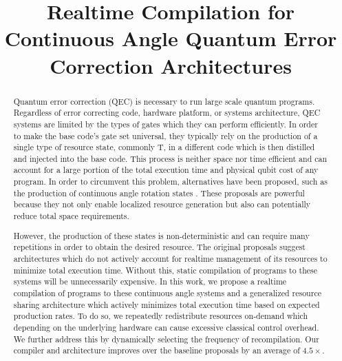 \documentclass[nonacm,sigplan]{acmart}
\begin{document}
\title{Realtime Compilation for Continuous Angle Quantum Error Correction Architectures}


\begin{abstract}
Quantum error correction (QEC) is necessary to run large scale quantum programs. Regardless of error correcting code, hardware platform, or systems architecture, QEC systems are limited by the types of gates which they can perform efficiently. In order to make the base code's gate set universal, they typically rely on the production of a single type of resource state, commonly T, in a different code which is then distilled and injected into the base code. This process is neither space nor time efficient and can account for a large portion of the total execution time and physical qubit cost of any program. In order to circumvent this problem, alternatives have been proposed, such as the production of continuous angle rotation states \cite{akahoshi2023partially, ding2018magic}. These proposals are powerful because they not only enable localized resource generation but also can potentially reduce total space requirements. 

However, the production of these states is non-deterministic and can require many repetitions in order to obtain the desired resource. The original proposals suggest architectures which do not actively account for realtime management of its resources to minimize total execution time. Without this, static compilation of programs to these systems will be unnecessarily expensive. In this work, we propose a realtime compilation of programs to these continuous angle systems and a generalized resource sharing architecture which actively minimizes total execution time based on expected production rates. To do so, we repeatedly redistribute resources on-demand which depending on the underlying hardware can cause excessive classical control overhead. We further address this by dynamically selecting the frequency of recompilation. Our compiler and architecture improves over the baseline proposals by an average of $4.5\times$.
\end{abstract}

\maketitle %
\pagestyle{plain} %
\end{document}

